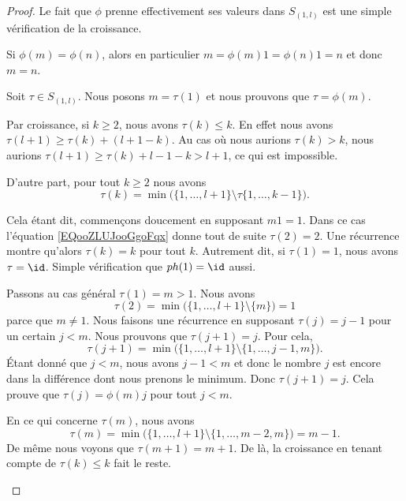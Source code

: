 \begin{proof}
	Le fait que \( \phi\) prenne effectivement ses valeurs dans \( S_{(1,l)}\) est une simple vérification de la croissance.
	\begin{subproof}
		\spitem[Injective]
		Si \( \phi(m)=\phi(n)\), alors en particulier \( m=\phi(m)1=\phi(n)1=n\) et donc \( m=n\).

		\spitem[Surjective]
		Soit \( \tau\in S_{(1,l)}\). Nous posons \( m=\tau(1)\) et nous prouvons que \( \tau=\phi(m)\).

		Par croissance, si \( k\geq 2\), nous avons \( \tau(k)\leq k\). En effet nous avons \( \tau(l+1)\geq \tau(k)+(l+1-k)\). Au cas où nous aurions \( \tau(k)>k\), nous aurions \( \tau(l+1)\geq \tau(k)+l-1-k>l+1\), ce qui est impossible.

		D'autre part, pour tout \( k\geq 2\) nous avons
		\begin{equation}		\label{EQooZLUJooGgoFqx}
			\tau(k)=\min\Big( \{ 1,\ldots,l+1 \}\setminus\tau\{ 1,\ldots,k-1 \}  \Big).
		\end{equation}

		Cela étant dit, commençons doucement en supposant \( m1=1\). Dans ce cas l'équation \eqref{EQooZLUJooGgoFqx} donne tout de suite \( \tau(2)=2\). Une récurrence montre qu'alors \( \tau(k)=k\) pour tout \( k\). Autrement dit, si \( \tau(1)=1\), nous avons \( \tau=\id\). Simple vérification que \( ph(1)=\id\) aussi.

		Passons au cas général \( \tau(1)=m>1\). Nous avons
		\begin{equation}
			\tau(2)=\min\Big(    \{ 1,\ldots,l+1 \}\setminus\{ m \}  \Big)=1
		\end{equation}
		parce que \( m\neq 1\).
		Nous faisons une récurrence en supposant \( \tau(j)=j-1\) pour un certain \( j<m\). Nous prouvons que \( \tau(j+1)=j\). Pour cela,
		\begin{equation}
			\tau(j+1)=\min\Big(   \{ 1,\ldots,l+1 \}\setminus\{ 1,\ldots,j-1,m \}   \Big).
		\end{equation}
		Étant donné que \( j<m\), nous avons \( j-1<m\) et donc le nombre \( j\) est encore dans la différence dont nous prenons le minimum. Donc \( \tau(j+1)=j\). Cela prouve que \( \tau(j)=\phi(m)j\) pour tout \( j<m\).

		En ce qui concerne \( \tau(m)\), nous avons
		\begin{equation}
			\tau(m)=\min\Big( \{ 1,\ldots,l+1 \}\setminus\{ 1,\ldots,m-2,m \}  \Big)=m-1.
		\end{equation}
		De même nous voyons que \( \tau(m+1)=m+1\). De là, la croissance en tenant compte de \( \tau(k)\leq k\) fait le reste.


\end{subproof}
\end{proof}
